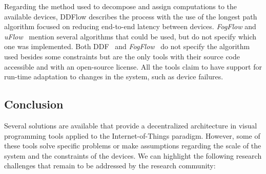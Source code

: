 Regarding the method used to decompose and assign computations to the available devices, DDFlow describes the process with the use of the longest path algorithm focused on reducing end-to-end latency between devices. \textit{FogFlow} and \textit{uFlow}~\cite{fog_flow,flow_based_programming_fog} mention several algorithms that could be used, but do not specify which one was implemented. Both DDF~\cite{ddf} and \textit{FogFlow}~\cite{fog_flow_easy,fog_flow_tool} do not specify the algorithm used besides some constraints but are the only tools with their source code accessible and with an open-source license. All the tools claim to have support for run-time adaptation to changes in the system, such as device failures.


\subsection{Conclusion}\label{sec:decentralized_sota_conclusion}

Several solutions are available that provide a decentralized architecture in visual programming tools applied to the Internet-of-Things paradigm. However, some of these tools solve specific problems or make assumptions regarding the scale of the system and the constraints of the devices. We can highlight the following research challenges that remain to be addressed by the research community:

